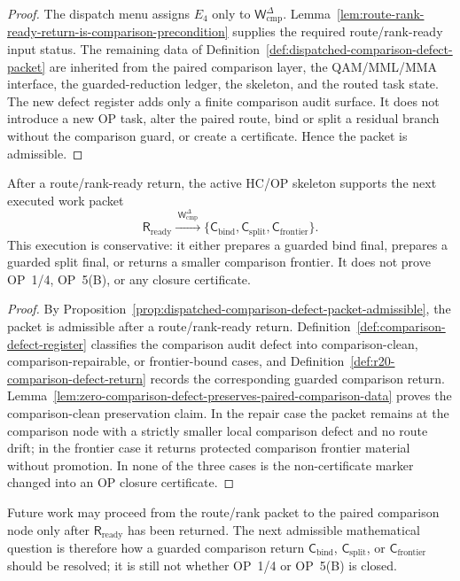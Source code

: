 \begin{proof}
The dispatch menu assigns \(E_4\) only to \(\mathsf W_{\mathrm{cmp}}^{\Delta}\). Lemma~\ref{lem:route-rank-ready-return-is-comparison-precondition} supplies the required route/rank-ready input status. The remaining data of Definition~\ref{def:dispatched-comparison-defect-packet} are inherited from the paired comparison layer, the QAM/MML/MMA interface, the guarded-reduction ledger, the skeleton, and the routed task state. The new defect register adds only a finite comparison audit surface. It does not introduce a new OP task, alter the paired route, bind or split a residual branch without the comparison guard, or create a certificate. Hence the packet is admissible.
\end{proof}

\begin{theorem}
\label{thm:first-dispatched-comparison-defect-packet}
After a route/rank-ready return, the active HC/OP skeleton supports the next executed work packet
\[
 \mathsf R_{\mathrm{ready}}
 \xrightarrow{\;\mathsf W_{\mathrm{cmp}}^{\Delta}\;}
 \{\mathsf C_{\mathrm{bind}},\mathsf C_{\mathrm{split}},\mathsf C_{\mathrm{frontier}}\}.
\]
This execution is conservative: it either prepares a guarded bind final, prepares a guarded split final, or returns a smaller comparison frontier. It does not prove OP~1/4, OP~5(B), or any closure certificate.
\end{theorem}

\begin{proof}
By Proposition~\ref{prop:dispatched-comparison-defect-packet-admissible}, the packet is admissible after a route/rank-ready return. Definition~\ref{def:comparison-defect-register} classifies the comparison audit defect into comparison-clean, comparison-repairable, or frontier-bound cases, and Definition~\ref{def:r20-comparison-defect-return} records the corresponding guarded comparison return. Lemma~\ref{lem:zero-comparison-defect-preserves-paired-comparison-data} proves the comparison-clean preservation claim. In the repair case the packet remains at the comparison node with a strictly smaller local comparison defect and no route drift; in the frontier case it returns protected comparison frontier material without promotion. In none of the three cases is the non-certificate marker changed into an OP closure certificate.
\end{proof}

\begin{corollary}
\label{cor:v3340-r20-working-rule}
Future work may proceed from the route/rank packet to the paired comparison node only after \(\mathsf R_{\mathrm{ready}}\) has been returned. The next admissible mathematical question is therefore how a guarded comparison return \(\mathsf C_{\mathrm{bind}}\), \(\mathsf C_{\mathrm{split}}\), or \(\mathsf C_{\mathrm{frontier}}\) should be resolved; it is still not whether OP~1/4 or OP~5(B) is closed.
\end{corollary}

